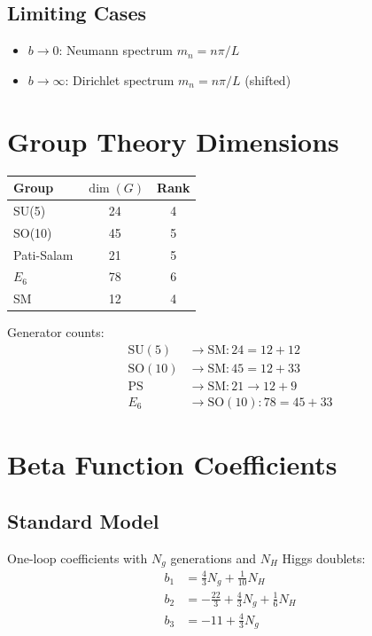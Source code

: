 \documentclass[11pt,a4paper]{article}
\begin{document}
\subsection{Limiting Cases}

\begin{itemize}
\item $b \to 0$: Neumann spectrum $m_n = n\pi/L$
\item $b \to \infty$: Dirichlet spectrum $m_n = n\pi/L$ (shifted)
\end{itemize}

\section{Group Theory Dimensions}
\label{app:group}

\begin{center}
\begin{tabular}{lcc}
\toprule
Group & $\dim(G)$ & Rank \\
\midrule
SU(5) & 24 & 4 \\
SO(10) & 45 & 5 \\
Pati-Salam & 21 & 5 \\
$E_6$ & 78 & 6 \\
SM & 12 & 4 \\
\bottomrule
\end{tabular}
\end{center}

Generator counts:
\begin{align}
\text{SU}(5) &\to \text{SM}: 24 = 12 + 12 \label{eq:su5-count} \\
\text{SO}(10) &\to \text{SM}: 45 = 12 + 33 \label{eq:so10-count} \\
\text{PS} &\to \text{SM}: 21 \to 12 + 9 \label{eq:ps-count} \\
E_6 &\to \text{SO}(10): 78 = 45 + 33 \label{eq:e6-count}
\end{align}

\section{Beta Function Coefficients}
\label{app:beta}

\subsection{Standard Model}

One-loop coefficients with $N_g$ generations and $N_H$ Higgs doublets:
\begin{align}
b_1 &= \frac{4}{3}N_g + \frac{1}{10}N_H \label{eq:b1} \\
b_2 &= -\frac{22}{3} + \frac{4}{3}N_g + \frac{1}{6}N_H \label{eq:b2} \\
b_3 &= -11 + \frac{4}{3}N_g \label{eq:b3}
\end{align}
\end{document}
